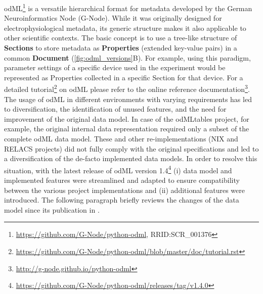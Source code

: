{odML\footnote{\url{https://github.com/G-Node/python-odml}, RRID:SCR\_001376} is a versatile hierarchical format for metadata \citep{Grewe_2011} developed by the German Neuroinformatics Node (G-Node). While it was originally designed for electrophysiological metadata, its generic structure makes it also applicable to other scientific contexts.
% 
The basic concept is to use a tree-like structure of \textbf{Sections} to store metadata as \textbf{Properties} (extended key-value pairs) in a common \textbf{Document} (\cref{fig:odml_versions}B). For example, using this paradigm,  parameter settings of a specific device used in the experiment would be represented as Properties collected in a specific Section for that device. For a detailed tutorial\footnote{\url{https://github.com/G-Node/python-odml/blob/master/doc/tutorial.rst}} on odML please refer to the online reference documentation\footnote{\url{http://g-node.github.io/python-odml}}. The usage of odML in different environments with varying requirements has led to diversification, the identification of unused features, and the need for improvement of the original data model. In case of the odMLtables project, for example, the original internal data representation required only a subset of the complete odML data model. These and other re-implementations (NIX and RELACS projects) did not fully comply with the original specifications and led to a diversification of the de-facto implemented data models. In order to resolve this situation, with the latest release of odML version 1.4\footnote{\url{https://github.com/G-Node/python-odml/releases/tag/v1.4.0}} (i) data model and implemented features were streamlined and adapted to ensure compatibility between the various project implementations and (ii) additional features were introduced. The following paragraph briefly reviews the changes of the data model since its publication in \cite{Grewe_2011}.

}
